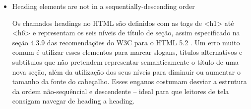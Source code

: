 \documentclass[
	12pt,				%
	openright,			%
	oneside,			%
	a4paper,			%
	chapter=TITLE,		%
	section=TITLE,		%
	subsection=TITLE,	%
	subsubsection=TITLE,%
	english,			%
	brazil				%
	]{abntex2}
\theoremstyle{definition}
\begin{document}
\begin{itemize}
\pagebreak

Para resolver esse problema é preciso identificar quais elementos têm o mesmo id (veja a figura \ref{Identificação dos elementos compartilhando o mesmo Id}) e modificá-los para que cada um tenha seu próprio id. Uma alternativa é cogitar retirar o id dos elementos e manipulá-los por suas classes.

\begin{figure}[!h]
\centering
\caption{Identificação dos elementos compartilhando o mesmo Id}
\label{Identificação dos elementos compartilhando o mesmo Id}
\end{figure}

 \item Heading elements are not in a sequentially-descending order
 \label{sec:heading}
   
Os chamados headings no HTML são definidos com as tags de <h1> até <h6> e representam os seis níveis de título de seção, assim especificado na seção 4.3.9 das recomendações do W3C para o HTML 5.2 \cite{caldwell2008web}. Um erro muito comum é utilizar esses elementos para marcar slogans, títulos alternativos e subtítulos que não pretendem representar semanticamente o título de uma nova seção, além da utilização dos seus níveis para diminuir ou aumentar o tamanho da fonte do cabeçalho. Esses enganos costumam desviar a estrutura da ordem não-sequêncial e descendente – ideal para que leitores de tela consigam navegar de heading a heading.


\end{itemize}
\end{document}
